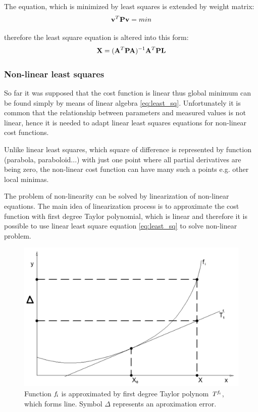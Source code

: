 \documentclass[a4paper,12pt]{article}
\newcommand{\ematr}[1]{
{\bf #1}
}
\newcommand{\evect}[1]{
{\bf #1}
}
\newcommand{\efunc}[1]{
{\it #1}
}
\begin{document}
The equation, which is minimized by least squares is extended by weight matrix:
\begin{equation}
\evect{v}^{T}  \ematr{P} \evect{v} = min
\end{equation}

therefore the least square equation is altered into this form:
\begin{equation}
\label{eq:least_sq}
\evect{X} = (\ematr{A}^{T} \ematr{P} \ematr{A})^{-1} \ematr{A}^{T} \ematr{P} \ematr{L}
\end{equation}

\subsubsection{Non-linear least squares}
\label{sec:non_least}
So far it was supposed that the cost function is linear thus global minimum can be found simply by means of linear algebra  \eqref{eq:least_sq}.
Unfortunately it is common that the relationship between parameters and 
measured values is not linear, hence it is needed to adapt linear least squares equations for non-linear
cost functions.

Unlike linear least squares, which square of difference \label{eq:least_be_part}
is represented by function  (parabola, paraboloid...) with just one point where all
partial derivatives are being zero, the non-linear cost function can have many such a points e.g. other local minimas. 

The problem of non-linearity can be solved by linearization of non-linear equations.
The main idea of linearization process is to approximate the cost function with first degree Taylor polynomial,
which is linear and therefore it is possible to use linear least square equation \eqref{eq:least_sq} 
to solve non-linear problem. 

\begin{figure}[h]
    \centering
    \includegraphics[scale=0.2]{figures/taylor.png}
    \caption{Function $\efunc{f}_{i}$ is approximated by first degree Taylor polynom $\efunc{T} ^{\efunc{f}_{i}}$,
    which forms line. Symbol $\Delta$ represents an aproximation error.}
    \label{fig:taylor}
\end{figure}
\end{document}
